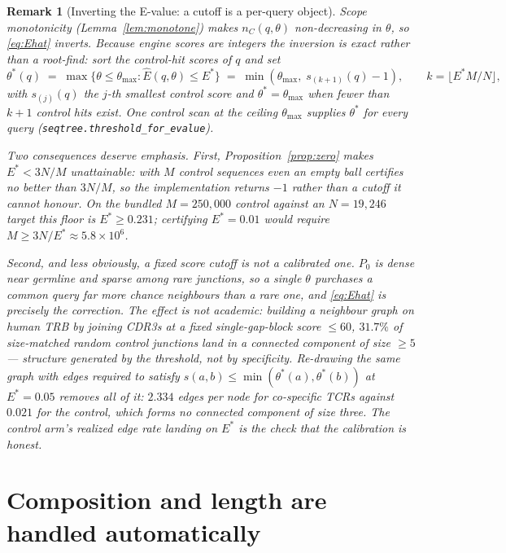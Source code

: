 \documentclass[11pt]{article}
\theoremstyle{oldplain}
\theoremstyle{oldrem}
\newtheorem{remark}{Remark}
\newcommand{\Pzero}{P_{0}}
\begin{document}
\begin{remark}[Inverting the E-value: a cutoff is a per-query object]\label{rem:threshold}
Scope monotonicity (Lemma~\ref{lem:monotone}) makes $n_C(q,\theta)$ non-decreasing in $\theta$, so
\eqref{eq:Ehat} inverts. Because engine scores are integers the inversion is exact rather than a
root-find: sort the control-hit scores of $q$ and set
\begin{equation}\label{eq:theta}
  \theta^\ast(q) \;=\; \max\{\theta \le \theta_{\max} : \widehat E(q,\theta) \le E^\ast\}
  \;=\; \min\!\left(\theta_{\max},\; s_{(k+1)}(q) - 1\right), \qquad k = \lfloor E^\ast M/N \rfloor,
\end{equation}
with $s_{(j)}(q)$ the $j$-th smallest control score and $\theta^\ast=\theta_{\max}$ when fewer than
$k+1$ control hits exist. One control scan at the ceiling $\theta_{\max}$ supplies $\theta^\ast$ for
every query (\texttt{seqtree.threshold\_for\_evalue}).

Two consequences deserve emphasis. First, Proposition~\ref{prop:zero} makes $E^\ast < 3N/M$
\emph{unattainable}: with $M$ control sequences even an empty ball certifies no better than $3N/M$,
so the implementation returns $-1$ rather than a cutoff it cannot honour. On the bundled
$M=250{,}000$ control against an $N=19{,}246$ target this floor is $E^\ast \ge 0.231$; certifying
$E^\ast=0.01$ would require $M \ge 3N/E^\ast \approx 5.8\times10^6$.

Second, and less obviously, a \emph{fixed} score cutoff is not a calibrated one. $\Pzero$ is dense
near germline and sparse among rare junctions, so a single $\theta$ purchases a common query far more
chance neighbours than a rare one, and \eqref{eq:Ehat} is precisely the correction. The effect is not
academic: building a neighbour graph on human TRB by joining CDR3s at a fixed single-gap-block score
$\le 60$, $31.7\%$ of size-matched \emph{random control} junctions land in a connected component of
size $\ge 5$ --- structure generated by the threshold, not by specificity. Re-drawing the same graph
with edges required to satisfy $s(a,b) \le \min(\theta^\ast(a),\theta^\ast(b))$ at $E^\ast=0.05$
removes all of it: $2.334$ edges per node for co-specific TCRs against $0.021$ for the control, which
forms no connected component of size three. The control arm's realized edge rate landing on $E^\ast$
is the check that the calibration is honest.
\end{remark}

\section{Composition and length are handled automatically}\label{sec:composition}
\end{document}
